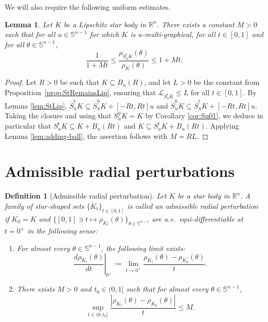 \documentclass[11pt]{article}
\newtheorem{lem}[thm]{Lemma}
\newtheorem{defn}[thm]{Definition}
\theoremstyle{definition}
\theoremstyle{proof}
\newcommand{\dht}[1]{\left . \frac{d#1}{dt}\right |_{0^+}}
\DeclareMathOperator{\+}{\mathop{\tilde{+}}}
\newcommand{\Lip}{\mathcal{L}}
\newcommand{\R}{\mathbb{R}}
\renewcommand{\S}{\mathbb{S}}
\numberwithin{equation}{section}
\numberwithin{equation}{section}
\begin{document}
We will also require the following uniform estimates.
\begin{lem} \label{lem:uniform-ratio}
Let $K$ be a Lipschitz star body in $\R^n$. There exists a constant $M > 0$ such that for all $u \in \S^{n-1}$ for which $K$ is $u$-multi-graphical, for all $t \in [0,1]$ and for all $\theta \in \S^{n-1}$,
\[
\frac{1}{1 + M t} \leq \frac{\rho_{S^t_u K}(\theta)}{\rho_{K}(\theta)} \leq 1 + M t . 
\]
\end{lem}
\begin{proof}
Let $R > 0$ be such that $K \subseteq B_n(R)$, and let $L>0$ be the constant from Proposition~\ref{prop:StRemainsLip}, ensuring that $\Lip_{S_u^t K} \leq L$ for all $t \in [0,1]$. By Lemma \ref{lem:StLip}, $\mathring S^t_u K \subseteq \mathring S^0_u K + [-Rt,Rt] u$ and $\mathring S^0_u K \subseteq \mathring S^t_u K + [-Rt,Rt] u$. Taking the closure and using that $S_u^0 K = K$ by Corollary \ref{cor:Su01}, we deduce in particular that $S^t_u K \subseteq K + B_n(Rt)$ and $K \subseteq S^t_u K + B_n(Rt)$. Applying Lemma \ref{lem:adding-ball}, the assertion follows with $M = R L$. 
\end{proof}



\section{Admissible radial perturbations} \label{sec:admissible}



\begin{defn}[Admissible radial perturbation] \label{def:admissible}
Let $K$ be a star body in $\R^n$. A family of star-shaped sets $\{K_t\}_{t \in [0,1]}$ is called an admissible radial perturbation if $K_0 = K$ and $\{ [0,1] \ni t \mapsto \rho_{K_t}(\theta) \}_{\theta \in \S^{n-1}}$ are a.e.~equi-differentiable at $t=0^+$ in the following sense:
\begin{enumerate}
\item For almost every $\theta \in \S^{n-1}$, the following limit exists:
\begin{equation} \label{eq:arp-1}
 \dht{\rho_{K_t}(\theta)}  := \lim_{t \rightarrow 0^+} \frac{\rho_{K_t}(\theta) - \rho_{K_0}(\theta)}{t} . 
 \end{equation}
\item There exists $M > 0$ and $t_0 \in (0,1]$ such that for almost every $\theta \in \S^{n-1}$,
\begin{equation} \label{eq:arp-2}
\sup_{t \in (0,t_0]} \frac{|\rho_{K_t}(\theta) - \rho_{K_0}(\theta)|}{t} \leq M . 
\end{equation}
\end{enumerate}
\end{defn}
\end{document}
